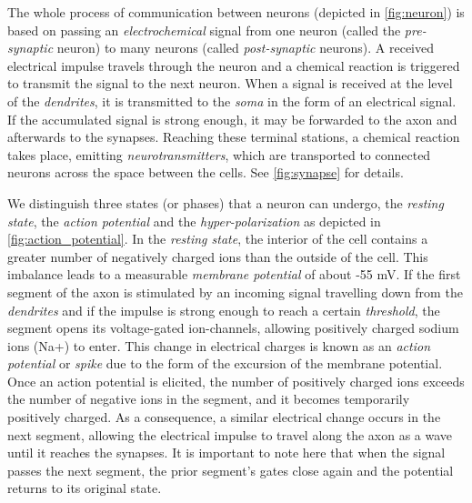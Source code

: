 The whole process of communication between neurons (depicted in \autoref{fig:neuron}) is based on passing an \emph{electrochemical} signal from one neuron (called the \emph{pre-synaptic} neuron) to many neurons (called \emph{post-synaptic} neurons). A received electrical impulse travels through the neuron and a chemical reaction is triggered to transmit the signal to the next neuron. When a signal is received at the level of the \emph{dendrites}, it is transmitted to the \emph{soma} in the form of an electrical signal. If the accumulated signal is strong enough, it may be forwarded to the axon and afterwards to the synapses. Reaching these terminal stations, a chemical reaction takes place, emitting \emph{neurotransmitters}, which are transported to connected neurons across the space between the cells. See \autoref{fig:synapse} for details.

We distinguish three states (or phases) that a neuron can undergo, the \emph{resting state}, the \emph{action potential} and the \emph{hyper-polarization} as depicted in \autoref{fig:action_potential}. In the \emph{resting state}, the interior of the cell contains a greater number of negatively charged ions than the outside of the cell. This imbalance leads to a measurable \emph{membrane potential} of about -55 mV. If the first segment of the axon is stimulated by an incoming signal travelling down from the \emph{dendrites} and if the impulse is strong enough to reach a certain \emph{threshold}, the segment opens its voltage-gated ion-channels, allowing positively charged sodium ions (Na+) to enter. This change in electrical charges is known as an \emph{action potential} or \emph{spike} due to the form of the excursion of the membrane potential. Once an action potential is elicited, the number of positively charged ions exceeds the number of negative ions in the segment, and it becomes temporarily positively charged. As a consequence, a similar electrical change occurs in the next segment, allowing the electrical impulse to travel along the axon as a wave until it reaches the synapses. It is important to note here that when the signal passes the next segment, the prior segment's gates close again and the potential returns to its original state.

